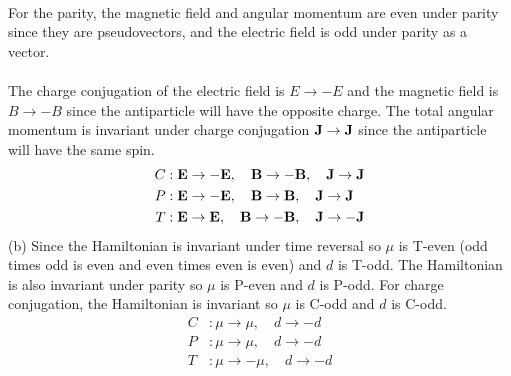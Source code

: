 \documentclass[../main.tex]{subfiles}
\begin{document}
\paragraph*{}For the parity, the magnetic field and angular momentum are even under parity since 
they are pseudovectors, and the electric field is odd under parity as a vector.

\paragraph*{} The charge conjugation of the electric field is $E \to -E$ and the magnetic field is
$B \to -B$ since the antiparticle will have the opposite charge. The total angular momentum is
invariant under charge conjugation $\vb J \to \vb J$ since the antiparticle will have the same spin.
\begin{align*}
    C&: \vb E \to -\vb E, \quad \vb B \to -\vb B, \quad \vb J \to \vb J \\
    P&: \vb E \to -\vb E, \quad \vb B \to \vb B, \quad \vb J \to \vb J \\
    T&: \vb E \to \vb E, \quad \vb B \to -\vb B, \quad \vb J \to -\vb J
\end{align*}
(b) Since the Hamiltonian is invariant under time reversal so $\mu$ is T-even (odd times odd is even
and even times even is even) and $d$ is T-odd. The Hamiltonian is also invariant under parity so
$\mu$ is P-even and $d$ is P-odd. For charge conjugation, the Hamiltonian is invariant so $\mu$ is
C-odd and $d$ is C-odd.
\begin{align*}
    C&: \mu \to \mu, \quad d \to -d \\
    P&: \mu \to \mu, \quad d \to -d \\
    T&: \mu \to -\mu, \quad d \to -d
\end{align*}
\end{document}
